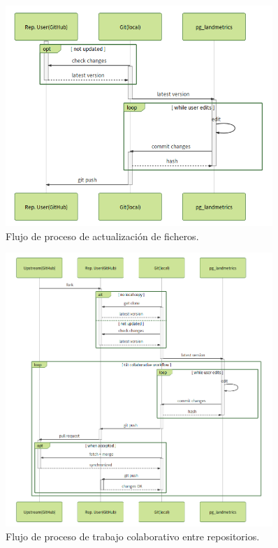 \begin{figure}
\begin{center}
\includegraphics[width=0.9\textwidth]{Metodologia/Figs/diary.png}
\caption{Flujo de proceso de actualización de ficheros. \label{fig:diary}}
\end{center}
\end{figure}



\begin{figure}
\begin{center}
\includegraphics[width=0.9\textwidth]{Metodologia/Figs/pullrequest.png}
\caption{Flujo de proceso de trabajo colaborativo entre repositorios. \label{fig:pullrequest}}
\end{center}
\end{figure}


